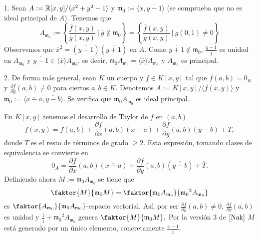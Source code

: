 \documentclass[../main.tex]{subfiles}
\begin{document}
\begin{example} 1. Sean $A:=\mathbb{R}[x,y]/\langle x^2+y^2-1\rangle$ y $\mathfrak m_0:=\langle \overline{x},\overline{y-1}\rangle$ (se comprueba que no es ideal principal de $A$).
	Tenemos que
	$$A_{\mathfrak m_0}:=\left\{\frac{\overline{f}(x,y)}{\overline{g}(x,y)}\ \big|\ \overline{g}\notin\mathfrak m_0\right\}=\left\{\frac{\overline{f}(x,y)}{\overline{g}(x,y)}\ \big|\ g(0,1)\neq 0\right\}$$
	Observemos que $\overline{x}^2=(\overline{y-1})(\overline{y+1})$ en $A.$ Como $\overline{y+1}\notin \mathfrak m_0$, $\frac{\overline{y-1}}{\overline{1}}$ es unidad en $A_{\mathfrak m_0}$ y $\overline{y-1}\in\langle\overline{x}\rangle A_{\mathfrak m_0}$, es decir, $\mathfrak m_0 A_{\mathfrak m_0}=\langle \overline{x}\rangle A_{\mathfrak m_0}$ y $A_{\mathfrak m_0}$ es principal.

	2. De forma más general, sean $K$ un cuerpo y $f\in K[x,y]$ tal que $f(a,b)=0_K$ y $\frac{\partial f}{\partial y}(a,b)\neq 0$ para ciertos $a,b\in K.$ Denotemos $A:=K[x,y]/\langle f(x,y)\rangle$ y $\mathfrak m_0:=\langle \overline{x-a},\overline{y-b}\rangle.$ Se verifica que $\mathfrak m_0 A_{\mathfrak m_0}$ es ideal principal.

	En $K[x,y]$ tenemos el desarrollo de Taylor de $f$ en $(a,b)$
	\begin{equation}\label{Tay1}
	f(x,y)=f(a,b)+\frac{\partial f}{\partial x}(a,b)(x-a)+\frac{\partial f}{\partial y}(a,b)(y-b)+T,
	\end{equation}
	donde $T$ es el resto de términos de grado $\ge 2.$ Esta expresión, tomando clases de equivalencia se convierte en
	\begin{equation}\label{Tay2}
	0_A=\frac{\partial f}{\partial x}(a,b)(\overline{x-a})+\frac{\partial f}{\partial y}(a,b)(\overline{y-b})+\overline{T}.
	\end{equation}
	Definiendo ahora $M:=\mathfrak m_0 A_{\mathfrak m_0}$ se tiene que
	$$\faktor{M}{\mathfrak m_0 M}=\faktor{\mathfrak m_0 A_{\mathfrak m_0}}{{{\mathfrak m_0}^2} A_{\mathfrak m_0}}$$
	es $\faktor{ A_{\mathfrak m_0}}{{{\mathfrak m_0}} A_{\mathfrak m_0}}$-espacio vectorial. Así, por ser $\frac{\partial f}{\partial y}(a,b)\neq 0$, $\frac{\partial f}{\partial y}(a,b)$ es unidad y $\frac{\overline{1}}{\overline{1}}+{{\mathfrak m_0}^2} A_{\mathfrak m_0}$ genera $\faktor{M}{\mathfrak m_0 M}.$ Por la versión 3 de $\ref{Nak}$ $M$ está generado por un único elemento, concretamente $\frac{\overline{x-1}}{\overline 1}.$
\end{example}
\end{document}
